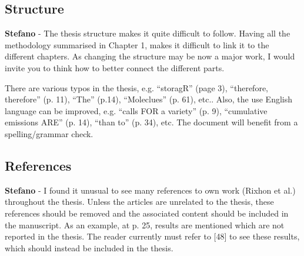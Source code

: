 \documentclass[12pt,a4paper]{article}
\begin{document}
\subsection{Structure}
\label{structure}

\begin{mdframed}[style=comment] %
{\color{orange} \textbf{Stefano}} - The thesis structure makes it quite difficult to follow. Having all the methodology summarised in Chapter 1, makes it difficult to link it to the different chapters. As changing the structure may be now a major work, I would invite you to think how to better connect the different parts. 
\end{mdframed}

\noindent

\begin{mdframed}[style=manuscript] %

\end{mdframed}

\begin{mdframed}[style=comment] %
There are various typos in the thesis, e.g. ``storagR'' (page 3), ``therefore, therefore'' (p. 11), ``The'' (p.14), ``Moleclues'' (p. 61), etc.. Also, the use English language can be improved, e.g. ``calls FOR a variety'' (p. 9), ``cumulative emissions ARE'' (p. 14), ``than to'' (p. 34), etc. The document will benefit from a spelling/grammar check.
\end{mdframed}

\noindent

\begin{mdframed}[style=manuscript] %

\end{mdframed}

\subsection{References}
\label{references}

\begin{mdframed}[style=comment] %
{\color{orange} \textbf{Stefano}} - I found it unusual to see many references to own work (Rixhon et al.) throughout the thesis. Unless the articles are unrelated to the thesis, these references should be removed and the associated content should be included in the manuscript. As an example, at p. 25, results are mentioned which are not reported in the thesis. The reader currently must refer to [48] to see these results, which should instead be included in the thesis. 
\end{mdframed}
\end{document}
